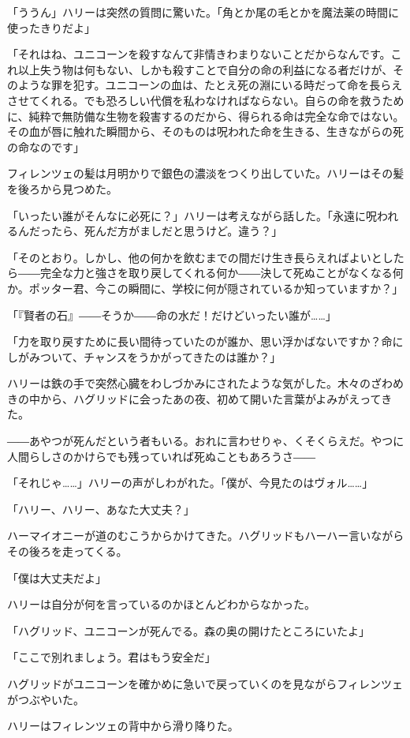 \documentclass[10pt,a4paper]{article}
\begin{document}
\begin{CJK}{UTF8}{min}
「ううん」ハリーは突然の質問に驚いた。「角とか尾の毛とかを魔法薬の時間に使ったきりだよ」

「それはね、ユニコーンを殺すなんて非情きわまりないことだからなんです。これ以上失う物は何もない、しかも殺すことで自分の命の利益になる者だけが、そのような罪を犯す。ユニコーンの血は、たとえ死の淵にいる時だって命を長らえさせてくれる。でも恐ろしい代償を私わなければならない。自らの命を救うために、純粋で無防備な生物を殺害するのだから、得られる命は完全な命ではない。その血が唇に触れた瞬間から、そのものは呪われた命を生きる、生きながらの死の命なのです」

フィレンツェの髪は月明かりで銀色の濃淡をつくり出していた。ハリーはその髪を後ろから見つめた。

「いったい誰がそんなに必死に？」ハリーは考えながら話した。「永遠に呪われるんだったら、死んだ方がましだと思うけど。違う？」

「そのとおり。しかし、他の何かを飲むまでの間だけ生き長らえればよいとしたら――完全な力と強さを取り戻してくれる何か――決して死ぬことがなくなる何か。ポッター君、今この瞬間に、学校に何が隠されているか知っていますか？」

「『賢者の石』――そうか――命の水だ！だけどいったい誰が……」

「力を取り戻すために長い間待っていたのが誰か、思い浮かばないですか？命にしがみついて、チャンスをうかがってきたのは誰か？」

ハリーは鉄の手で突然心臓をわしづかみにされたような気がした。木々のざわめきの中から、ハグリッドに会ったあの夜、初めて開いた言葉がよみがえってきた。

――あやつが死んだという者もいる。おれに言わせりゃ、くそくらえだ。やつに人間らしさのかけらでも残っていれば死ぬこともあろうさ――

「それじゃ……」ハリーの声がしわがれた。「僕が、今見たのはヴォル……」

「ハリー、ハリー、あなた大丈夫？」

ハーマイオニーが道のむこうからかけてきた。ハグリッドもハーハー言いながらその後ろを走ってくる。

「僕は大丈夫だよ」

ハリーは自分が何を言っているのかほとんどわからなかった。

「ハグリッド、ユニコーンが死んでる。森の奥の開けたところにいたよ」

「ここで別れましょう。君はもう安全だ」

ハグリッドがユニコーンを確かめに急いで戻っていくのを見ながらフィレンツェがつぶやいた。

ハリーはフィレンツェの背中から滑り降りた。


\end{CJK}
\end{document}
